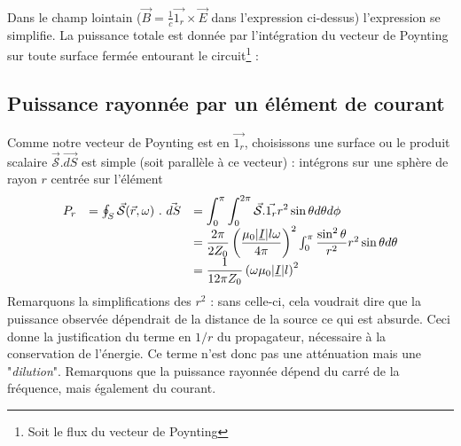 	\ 
	
	Dans le champ lointain ($\vec{B} = \frac{1}{c}\vec{1_r}\times\vec{E}$ dans 
	l'expression ci-dessus) l'expression se simplifie. La puissance totale est donnée par 
	l'intégration du vecteur de Poynting sur toute surface fermée entourant le circuit\footnote{
	Soit le flux du vecteur de Poynting} :\\
	
	\subsection{Puissance rayonnée par un élément de courant}
	Comme notre vecteur de Poynting est en $\vec{1_r}$, choisissons une surface ou le produit 
	scalaire $\vec{\mathcal{S}}.\vec{dS}$ est simple (soit parallèle à ce vecteur) : intégrons 
	sur une sphère de rayon $r$ centrée sur l'élément
	\begin{equation}
	\begin{array}{lll}
	P_r &= \oint_S \vec{\mathcal{S}}(\vec{r},\omega)\ .\ \vec{dS} &\DS = \int_0^{\pi}\int_0^{2\pi}
	\vec{\mathcal{S}}.\vec{1_r}r^2\sin\theta d\theta d\phi\\
	&&= \dfrac{2\pi}{2Z_0}\left(\dfrac{\mu_0|\underline{I}|l\omega}{4\pi}\right)^2 \int_0^\pi 
	\dfrac{\sin^2\theta}{r^2}r^2\sin\theta d\theta\\
	&&= \dfrac{1}{12\pi Z_0}\left(\omega\mu_0|\underline{I}|l\right)^2
	\end{array}
	\end{equation}
	Remarquons la simplifications des $r^2$ : sans celle-ci, cela voudrait dire que la puissance 
	observée dépendrait de la distance de la source ce qui est absurde. Ceci donne la justification 
	du terme en $1/r$ du propagateur, nécessaire à la conservation de l'énergie. Ce terme n'est 
	donc pas une atténuation mais une "\textit{dilution}". Remarquons que la puissance rayonnée 
	dépend du carré de la fréquence, mais également du courant.
	
